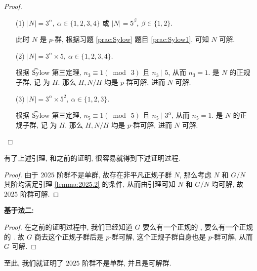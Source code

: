 \begin{proof}\
	\begin{itemize}
		\item[(1)] $|N|=3^{\alpha},\ \alpha\in\{1,2,3,4\}$ 或 $|N|=5^\beta,\ \beta\in\{1,2\}$.

		此时 $N$ 是 $p$-群, 根据习题 \ref{prac:Sylow} 题目 \ref{prac:Sylow1}, 可知 $N$ 可解.

		\item[(2)] $|N|=3^\alpha\times 5,\ \alpha\in\{1,2,3,4\}$.

		根据 \t{Sylow} 第三定理, $n_3\equiv 1(\bmod\ 3)$ 且 $n_3\mid 5$, 从而 $n_3=1$.
		\Sy[3]是 $N$ 的正规子群, 记 \Sy[3]为 $H$. 那么 $H,N/H$ 均是 $p$-群可解, 进而 $N$ 可解.

		\item[(3)] $|N|=3^\alpha\times 5^2,\ \alpha\in\{1,2,3\}$.

		根据 \t{Sylow} 第三定理, $n_5\equiv 1(\bmod\ 5)$ 且 $n_5\mid 3^\alpha$, 从而 $n_5=1$.
		\Sy[5]是 $N$ 的正规子群, 记 \Sy[5]为 $H$. 那么 $H,N/H$ 均是 $p$-群可解, 进而 $N$ 可解.
	\end{itemize}
\end{proof}

有了上述引理, 和之前的证明, 很容易就得到下述证明过程.

\begin{proof}
	由于 $2025$ 阶群不是单群, 故存在非平凡正规子群 $N$, 那么考虑 $N$ 和 $G/N$ 其阶均满足引理 \ref{lemma:2025.2} 的条件, 从而由引理可知 $N$ 和 $G/N$ 均可解, 故 $2025$ 阶群可解.
\end{proof}

\noindent\textbf{基于法二:}

\begin{proof}
	在之前的证明过程中, 我们已经知道 $G$ 要么有一个正规的 \Sy[5], 要么有一个正规的 \Sy[3]. 故 $G$ 商去这个正规子群后是 $p$-群可解, 这个正规子群自身也是 $p$-群可解, 从而 $G$ 可解.
\end{proof}

至此, 我们就证明了 $2025$ 阶群不是单群, 并且是可解群.
\specialsectionfalse